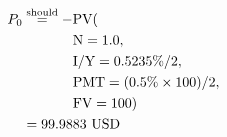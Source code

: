 \begin{align*}
P_{0}&\overset{\text{should}}{=}-\text{PV}(\\
	&\hspace{.5in}\text{N}=1.0,\\
	&\hspace{.5in}\text{I/Y}=0.5235\%/2,\\
	&\hspace{.5in}\text{PMT}=(0.5\%\times 100)/2,\\
	&\hspace{.5in}\text{FV}=100)\\
	&=99.9883\text{ USD}
\end{align*}

